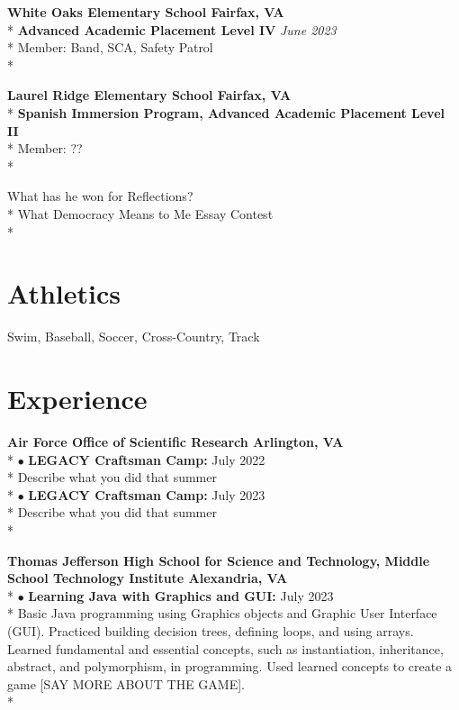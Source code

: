 \documentclass{article}
\begin{document}
\noindent \textbf{White Oaks Elementary School \hfill Fairfax, VA} \\*
\textbf{Advanced Academic Placement Level IV} \hfill \textit{June 2023} \\*
\textendash Member: Band, SCA, Safety Patrol\\*


\noindent \textbf{Laurel Ridge Elementary School \hfill Fairfax, VA} \\*
\textbf{Spanish Immersion Program, Advanced Academic Placement Level II} \hfill \textit{} \\*
\textendash Member: ?? \\*



\textendash What has he won for Reflections? \\*
\textendash What Democracy Means to Me Essay Contest \\*


\section{Athletics}
\textendash Swim, Baseball, Soccer, Cross-Country, Track

\section{Experience}

\noindent \textbf{Air Force Office of Scientific Research \hfill Arlington, VA} \\*
$\bullet$ \textbf{LEGACY Craftsman Camp:}  \hfill July 2022\\*
\indent \textendash Describe what you did that summer \\*
$\bullet$ \textbf{LEGACY Craftsman Camp:}  \hfill July 2023\\*
\indent \textendash Describe what you did that summer \\*


\noindent \textbf{Thomas Jefferson High School for Science and Technology, Middle School Technology Institute \hfill Alexandria, VA} \\*
$\bullet$ \textbf{Learning Java with Graphics and GUI:} \hfill July 2023\\*
\indent \textendash Basic Java programming using Graphics objects and Graphic User Interface (GUI). Practiced building decision trees, defining loops, and using arrays. Learned fundamental and essential concepts, such as instantiation, inheritance, abstract, and polymorphism, in programming. Used learned concepts to create a game [SAY MORE ABOUT THE GAME].\\*
\end{document}

